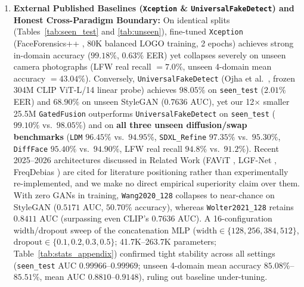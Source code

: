 \documentclass[fleqn,10pt]{wlscirep}
\begin{document}
\begin{enumerate}
    \item \textbf{External Published Baselines (\texttt{Xception} \& \texttt{UniversalFakeDetect}) and Honest Cross-Paradigm Boundary:} On identical splits (Tables~\ref{tab:seen_test} and \ref{tab:unseen}), fine-tuned \texttt{Xception} (FaceForensics++ \cite{ref12,ref28}, 80K balanced LOGO training, 2 epochs) achieves strong in-domain accuracy ($99.18\%$, $0.63\%$ EER) yet collapses severely on unseen camera photographs (LFW real recall $=7.0\%$, unseen 4-domain mean accuracy $=43.04\%$). Conversely, \texttt{UniversalFakeDetect} (Ojha et al.\ \cite{ref41}, frozen 304M CLIP ViT-L/14 linear probe) achieves $98.05\%$ on \texttt{seen\_test} ($2.01\%$ EER) and $68.90\%$ on unseen StyleGAN ($0.7636$ AUC), yet our 12$\times$ smaller 25.5M \texttt{GatedFusion} outperforms \texttt{UniversalFakeDetect} on \texttt{seen\_test} ($99.10\%$ vs.\ $98.05\%$) and on \textbf{all three unseen diffusion/swap benchmarks} (\texttt{LDM} $96.45\%$ vs.\ $94.95\%$, \texttt{SDXL\_Refine} $97.35\%$ vs.\ $95.30\%$, \texttt{DiffFace} $95.40\%$ vs.\ $94.90\%$, LFW real recall $94.8\%$ vs.\ $91.2\%$). Recent 2025--2026 architectures discussed in Related Work (FAViT \cite{ref43}, LGF-Net \cite{ref44}, FreqDebias \cite{ref45}) are cited for literature positioning rather than experimentally re-implemented, and we make no direct empirical superiority claim over them. With zero GANs in training, \texttt{Wang2020\_128} collapses to near-chance on StyleGAN ($0.5171$ AUC, $50.70\%$ accuracy), whereas \texttt{Wolter2021\_128} retains $0.8411$ AUC (surpassing even CLIP's $0.7636$ AUC). A 16-configuration width/dropout sweep of the concatenation MLP ($\text{width}\in\{128,256,384,512\}$, $\text{dropout}\in\{0.1,0.2,0.3,0.5\}$; 41.7K--263.7K parameters; Table~\ref{tab:stats_appendix}) confirmed tight stability across all settings (\texttt{seen\_test} AUC $0.99966$--$0.99969$; unseen 4-domain mean accuracy $85.08\%$--$85.51\%$, mean AUC $0.8810$--$0.9148$), ruling out baseline under-tuning.
\end{enumerate}
\end{document}
